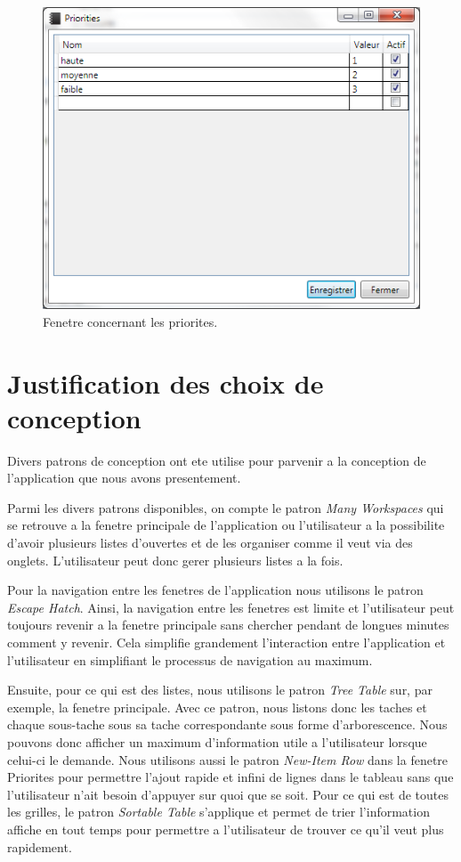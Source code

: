 \documentclass[letterpaper, oneside, 12pt, these, creativecommons]{thETS}
\begin{document}
\begin{figure}[H!]
	\centering
	\includegraphics[width=1\textwidth]{fenetre_priorite.png}
	\caption{Fenetre concernant les priorites.}
\end{figure}

\newpage

\section{Justification des choix de conception}

Divers patrons de conception ont ete utilise pour parvenir a la conception de l'application que nous avons presentement. 

Parmi les divers patrons disponibles, on compte le patron \emph{Many Workspaces} qui se retrouve a la fenetre principale de l'application ou l'utilisateur a la possibilite d'avoir plusieurs listes d'ouvertes et de les organiser comme il veut via des onglets. L'utilisateur peut donc gerer plusieurs listes a la fois. 

Pour la navigation entre les fenetres de l'application nous utilisons le patron \emph{Escape Hatch}. Ainsi, la navigation entre les fenetres est limite et l'utilisateur peut toujours revenir a la fenetre principale sans chercher pendant de longues minutes comment y revenir. Cela simplifie grandement l'interaction entre l'application et l'utilisateur en simplifiant le processus de navigation au maximum. 

Ensuite, pour ce qui est des listes, nous utilisons le patron \emph{Tree Table} sur, par exemple, la fenetre principale. Avec ce patron, nous listons donc les taches et chaque sous-tache sous sa tache correspondante sous forme d'arborescence. Nous pouvons donc afficher un maximum d'information utile a l'utilisateur lorsque celui-ci le demande. Nous utilisons aussi le patron \emph{New-Item Row} dans la fenetre Priorites pour permettre l'ajout rapide et infini de lignes dans le tableau sans que l'utilisateur n'ait besoin d'appuyer sur quoi que se soit. Pour ce qui est de toutes les grilles, le patron \emph{Sortable Table} s'applique et permet de trier l'information affiche en tout temps pour permettre a l'utilisateur de trouver ce qu'il veut plus rapidement. 
\end{document}
